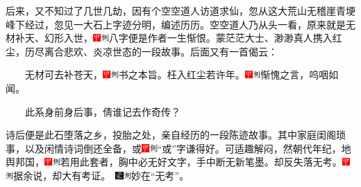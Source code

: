 后来，又不知过了几世几劫，因有个空空道人访道求仙，忽从这大荒山无稽崖青埂峰下经过，忽见一大石上字迹分明，编述历历。空空道人乃从头一看，原来就是无材补天、幻形入世，{\includegraphics[width=3mm]{../Images/00002}\includegraphics[width=3mm]{../Images/00011}\footnotesize 八字便是作者一生惭恨。}蒙茫茫大士、渺渺真人携入红尘，历尽离合悲欢、炎凉世态的一段故事。后面又有一首偈云：

　　无材可去补苍天，{\includegraphics[width=3mm]{../Images/00002}\includegraphics[width=3mm]{../Images/00011}\footnotesize 书之本旨。}枉入红尘若许年。{\includegraphics[width=3mm]{../Images/00002}\includegraphics[width=3mm]{../Images/00011}\footnotesize 惭愧之言，呜咽如闻。}

　　此系身前身后事，倩谁记去作奇传？

诗后便是此石堕落之乡，投胎之处，亲自经历的一段陈迹故事。其中家庭闺阁琐事，以及闲情诗词倒还全备，或{\includegraphics[width=3mm]{../Images/00002}\includegraphics[width=3mm]{../Images/00011}\footnotesize ``或''字谦得好。}可适趣解闷，然朝代年纪，地舆邦国，{\includegraphics[width=3mm]{../Images/00002}\includegraphics[width=3mm]{../Images/00011}\footnotesize 若用此套者，胸中必无好文字，手中断无新笔墨。}却反失落无考。{{\includegraphics[width=3mm]{../Images/00002}\includegraphics[width=3mm]{../Images/00011}\footnotesize 据余说，却大有考证。　}\includegraphics[width=3mm]{../Images/00006}\includegraphics[width=3mm]{../Images/00011}\footnotesize 妙在``无考''。}

